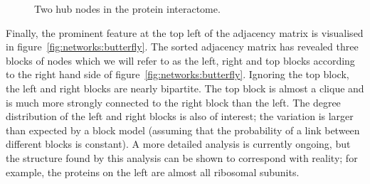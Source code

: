 \begin{figure}[ht]
  \centering
{}
  \caption{Two hub nodes in the protein interactome.}
  \label{fig:networks:hubs}
\end{figure}

Finally, the prominent feature at the top left of the adjacency matrix is visualised in figure~\ref{fig:networks:butterfly}.
The sorted adjacency matrix has revealed three blocks of nodes which we will refer to as the left, right and top blocks according to the right hand side of figure~\ref{fig:networks:butterfly}.
Ignoring the top block, the left and right blocks are nearly bipartite.
The top block is almost a clique and is much more strongly connected to the right block than the left.
The degree distribution of the left and right blocks is also of interest; the variation is larger than expected by a block model (assuming that the probability of a link between different blocks is constant).
A more detailed analysis is currently ongoing, but the structure found by this analysis can be shown to correspond with reality; for example, the proteins on the left are almost all ribosomal subunits.

